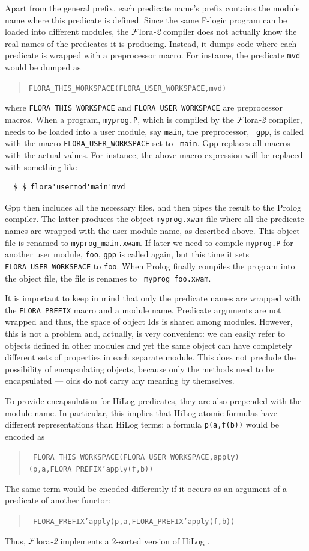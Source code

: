\documentclass[11pt]{article}
\newcommand{\FLORA}{{\mbox{\sc ${\cal F}${lora}\rm\emph{-2}}}\xspace}
\newcommand{\fl}{\mbox{F-logic}\xspace}
\newcommand{\ofile}{xwam}
\begin{document}
Apart from the general prefix, each predicate name's prefix contains the module
name where this predicate is defined. Since the same \fl program
can be loaded into different modules, the \FLORA compiler does not actually
know the real names of the predicates it is producing. Instead, it dumps
code where each predicate is wrapped with a preprocessor macro. For
instance, the predicate {\tt mvd} would be dumped as
\begin{quote}
 \tt FLORA\_THIS\_WORKSPACE(FLORA\_USER\_WORKSPACE,mvd)  
\end{quote}
where {\tt FLORA\_THIS\_WORKSPACE} and {\tt FLORA\_USER\_WORKSPACE} are
preprocessor macros. 
When a program, {\tt myprog.P}, which is compiled by the \FLORA compiler,
needs to be loaded into a user module, say {\tt main}, the preprocessor, {\tt
  gpp}, is called with the macro {\tt FLORA\_USER\_WORKSPACE} set to {\tt
  main}. Gpp replaces all macros with the actual values.
For instance, the above macro expression will be replaced with something like
\begin{verbatim}
 _$_$_flora'usermod'main'mvd  
\end{verbatim}
Gpp then includes all the
necessary files, and then pipes the result to the Prolog compiler. The latter
produces the object {\tt myprog.\ofile} file where all the predicate names are
wrapped with the user module name, as described above.  This object file is
renamed to {\tt myprog\_main.\ofile}. If later we need to compile {\tt myprog.P}
for another user module, {\tt foo}, {\tt gpp} is called again, but this time it
sets {\tt FLORA\_USER\_WORKSPACE} to {\tt foo}. When Prolog finally compiles
the program into the object file, the file is renames to {\tt
  myprog\_foo.\ofile}.

It is important to keep in mind that only the predicate names are wrapped
with the {\tt FLORA\_PREFIX} macro and a module name. Predicate arguments
are not wrapped and thus, the space of object Ids is shared among modules.
However, this is not a problem and, actually, is very convenient: we can
easily refer to objects defined in other modules and yet the same object
can have completely different sets of properties in each separate module.
This does not preclude the possibility of encapsulating objects, because
only the methods need to be encapsulated --- oids do not carry any meaning
by themselves.

To provide encapsulation for HiLog predicates, they are also prepended with
the module name. In particular, this implies that HiLog atomic formulas
have different representations than HiLog terms: a formula {\tt p(a,f(b))}
would be encoded as
\begin{quote}
 \tt
 FLORA\_THIS\_WORKSPACE(FLORA\_USER\_WORKSPACE,apply)(p,a,FLORA\_PREFIX'apply(f,b))  
\end{quote}
The same term would be encoded differently if it occurs as an argument of a
predicate of another functor:
\begin{quote}
 \tt
 FLORA\_PREFIX'apply(p,a,FLORA\_PREFIX'apply(f,b))    
\end{quote}
Thus, \FLORA implements a 2-sorted version of HiLog \cite{hilog-icdt-95}.
\end{document}
